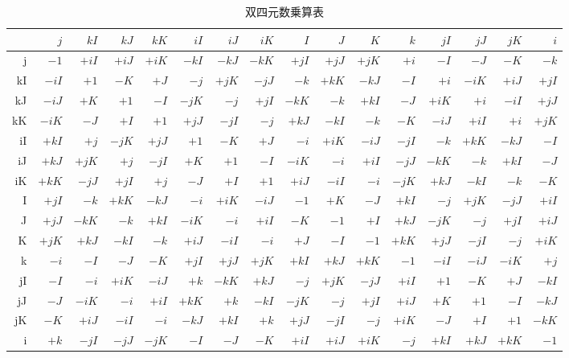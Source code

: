 \documentclass[a4paper]{article}
\begin{document}
\begin{table}[ht]
  \begin{center}
    \caption{双四元数乗算表}
    \small
    \begin{tabular}{r|rrrrrrrrrrrrrrr}
      &$j$&$kI$&$kJ$&$kK$&$iI$&$iJ$&$iK$&$I$&$J$&$K$&$k$&$jI$&$jJ$&$jK$&$i$ \\ \hline
      j&$-1$&$+iI$&$+iJ$&$+iK$&$-kI$&$-kJ$&$-kK$&$+jI$&$+jJ$&$+jK$&$+i$&$-I$&$-J$&$-K$&$-k$ \\ \hline
      kI&$-iI$&$+1$&$-K$&$+J$&$-j$&$+jK$&$-jJ$&$-k$&$+kK$&$-kJ$&$-I$&$+i$&$-iK$&$+iJ$&$+jI$ \\ \hline
      kJ&$-iJ$&$+K$&$+1$&$-I$&$-jK$&$-j$&$+jI$&$-kK$&$-k$&$+kI$&$-J$&$+iK$&$+i$&$-iI$&$+jJ$ \\ \hline
      kK&$-iK$&$-J$&$+I$&$+1$&$+jJ$&$-jI$&$-j$&$+kJ$&$-kI$&$-k$&$-K$&$-iJ$&$+iI$&$+i$&$+jK$ \\ \hline
      iI&$+kI$&$+j$&$-jK$&$+jJ$&$+1$&$-K$&$+J$&$-i$&$+iK$&$-iJ$&$-jI$&$-k$&$+kK$&$-kJ$&$-I$ \\ \hline
      iJ&$+kJ$&$+jK$&$+j$&$-jI$&$+K$&$+1$&$-I$&$-iK$&$-i$&$+iI$&$-jJ$&$-kK$&$-k$&$+kI$&$-J$ \\ \hline
      iK&$+kK$&$-jJ$&$+jI$&$+j$&$-J$&$+I$&$+1$&$+iJ$&$-iI$&$-i$&$-jK$&$+kJ$&$-kI$&$-k$&$-K$ \\ \hline
      I&$+jI$&$-k$&$+kK$&$-kJ$&$-i$&$+iK$&$-iJ$&$-1$&$+K$&$-J$&$+kI$&$-j$&$+jK$&$-jJ$&$+iI$ \\ \hline
      J&$+jJ$&$-kK$&$-k$&$+kI$&$-iK$&$-i$&$+iI$&$-K$&$-1$&$+I$&$+kJ$&$-jK$&$-j$&$+jI$&$+iJ$ \\ \hline
      K&$+jK$&$+kJ$&$-kI$&$-k$&$+iJ$&$-iI$&$-i$&$+J$&$-I$&$-1$&$+kK$&$+jJ$&$-jI$&$-j$&$+iK$ \\ \hline
      k&$-i$&$-I$&$-J$&$-K$&$+jI$&$+jJ$&$+jK$&$+kI$&$+kJ$&$+kK$&$-1$&$-iI$&$-iJ$&$-iK$&$+j$ \\ \hline
      jI&$-I$&$-i$&$+iK$&$-iJ$&$+k$&$-kK$&$+kJ$&$-j$&$+jK$&$-jJ$&$+iI$&$+1$&$-K$&$+J$&$-kI$ \\ \hline
      jJ&$-J$&$-iK$&$-i$&$+iI$&$+kK$&$+k$&$-kI$&$-jK$&$-j$&$+jI$&$+iJ$&$+K$&$+1$&$-I$&$-kJ$ \\ \hline
      jK&$-K$&$+iJ$&$-iI$&$-i$&$-kJ$&$+kI$&$+k$&$+jJ$&$-jI$&$-j$&$+iK$&$-J$&$+I$&$+1$&$-kK$ \\ \hline
      i&$+k$&$-jI$&$-jJ$&$-jK$&$-I$&$-J$&$-K$&$+iI$&$+iJ$&$+iK$&$-j$&$+kI$&$+kJ$&$+kK$&$-1$ \\ \hline
    \end{tabular}
  \end{center}
\end{table}
\end{document}
